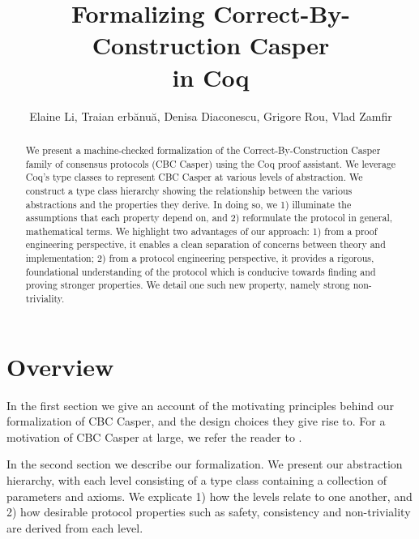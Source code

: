 \documentclass[runningheads]{llncs}
\begin{document}
	
\title{Formalizing Correct-By-Construction Casper \\ in Coq}

\author{Elaine Li, Traian erbănuă, Denisa Diaconescu, Grigore Rou, Vlad Zamfir}

\maketitle

\begin{abstract}
We present a machine-checked formalization of the Correct-By-Construction Casper family of consensus protocols (CBC Casper) using the Coq proof assistant. 
We leverage Coq's type classes to represent CBC Casper at various levels of abstraction. 
We construct a type class hierarchy showing the relationship between the various abstractions and the properties they derive. 
In doing so, we 1) illuminate the assumptions that each property depend on, and 2) reformulate the protocol in general, mathematical terms. 
We highlight two advantages of our approach: 1) from a proof engineering perspective, it enables a clean separation of concerns between theory and implementation; 2) from a protocol engineering perspective, it provides a rigorous, foundational understanding of the protocol which is conducive towards finding and proving stronger properties. We detail one such new property, namely strong non-triviality. 
\end{abstract}

\section{Overview} 
In the first section we give an account of the motivating principles behind our formalization of CBC Casper, and the design choices they give rise to. For a motivation of CBC Casper at large, we refer the reader to \cite{CBCfull}. 

In the second section we describe our formalization. We present our abstraction hierarchy, with each level consisting of a type class containing a collection of parameters and axioms. We explicate 1) how the levels relate to one another, and 2) how desirable protocol properties such as safety, consistency and non-triviality are derived from each level. 
\end{document}
